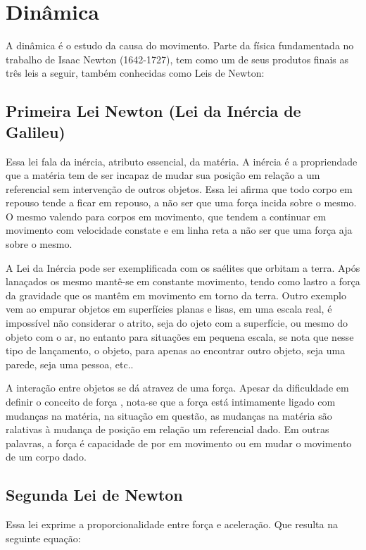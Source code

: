 \documentclass[12pt,a4paper]{book}
\begin{document}
	\section{Dinâmica}
A dinâmica é o estudo da causa do movimento. Parte da física fundamentada no trabalho de Isaac Newton (1642-1727), tem como um de seus produtos finais as três leis a seguir, também conhecidas como Leis de Newton:

		\subsection{Primeira Lei Newton (Lei da Inércia de Galileu)}
Essa lei fala da inércia, atributo essencial, da matéria. A inércia é a propriendade que a matéria tem de ser incapaz de mudar sua posição em relação a um referencial sem intervenção de outros objetos. Essa lei afirma que todo corpo em repouso tende a ficar em repouso, a não ser que uma força incida sobre o mesmo. O mesmo valendo para corpos em movimento, que tendem a continuar em movimento com velocidade constate e em linha reta a não ser que uma força aja sobre o mesmo.

A Lei da Inércia pode ser exemplificada com os saélites que orbitam a terra. Após lanaçados os mesmo mantê-se em constante movimento, tendo como lastro a força da gravidade que os mantêm em movimento em torno da terra. Outro exemplo vem ao empurar objetos em superfícies planas e lisas, em uma escala real, é impossível não considerar o atrito, seja do ojeto com a superfície, ou mesmo do objeto com o ar, no entanto para situações em pequena escala, se nota que nesse tipo de lançamento, o objeto, para apenas ao encontrar outro objeto, seja uma parede, seja uma pessoa, etc.. 

A interação entre objetos se dá atravez de uma força. Apesar da dificuldade em definir o conceito de força , nota-se que a força está intimamente ligado com mudanças na matéria, na situação em questão, as mudanças na matéria são ralativas à mudança de posição em relação um referencial dado. Em outras palavras, a força é capacidade de por em movimento ou em mudar o movimento de um corpo dado.

		\subsection{Segunda Lei de Newton}

Essa lei exprime a proporcionalidade entre força e aceleração. Que resulta na seguinte equação: 
\end{document}
